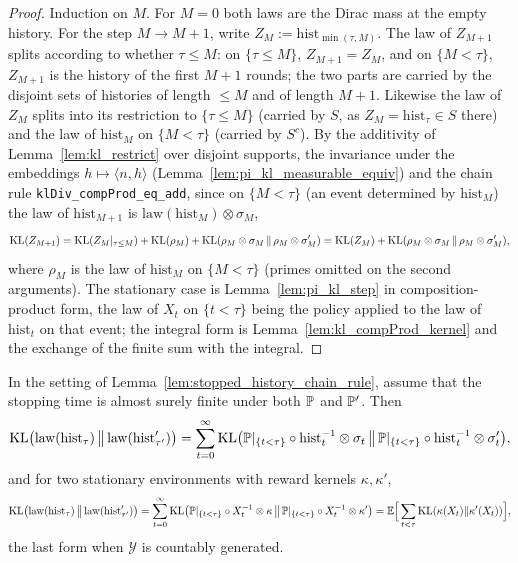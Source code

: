 \begin{proof}
\leanok
{}
Induction on $M$. For $M = 0$ both laws are the Dirac mass at the empty history. For the step
$M\to M+1$, write $Z_M := \mathrm{hist}_{\min(\tau,M)}$. The law of $Z_{M+1}$ splits according
to whether $\tau \le M$: on $\{\tau\le M\}$, $Z_{M+1} = Z_M$, and on $\{M < \tau\}$, $Z_{M+1}$ is the
history of the first $M+1$ rounds; the two parts are carried by the disjoint sets of histories of
length $\le M$ and of length $M+1$. Likewise the law of $Z_M$ splits into its restriction to
$\{\tau\le M\}$ (carried by $S$, as $Z_M = \mathrm{hist}_\tau \in S$ there) and the law of
$\mathrm{hist}_M$ on $\{M<\tau\}$ (carried by $S^c$). By the additivity of
Lemma~\ref{lem:kl_restrict} over disjoint supports, the invariance under the embeddings
$h\mapsto\langle n,h\rangle$ (Lemma~\ref{lem:pi_kl_measurable_equiv}) and the chain rule
\texttt{klDiv\_compProd\_eq\_add}, since on $\{M<\tau\}$ (an event determined by
$\mathrm{hist}_M$) the law of $\mathrm{hist}_{M+1}$ is $\mathrm{law}(\mathrm{hist}_M)\otimes\sigma_M$,
\[
  \mathrm{KL}(Z_{M+1}) = \mathrm{KL}(Z_M|_{\tau\le M}) + \mathrm{KL}(\rho_M) + \mathrm{KL}(\rho_M\otimes\sigma_M\,\|\,\rho_M\otimes\sigma'_M)
  = \mathrm{KL}(Z_M) + \mathrm{KL}(\rho_M\otimes\sigma_M\,\|\,\rho_M\otimes\sigma'_M),
\]
where $\rho_M$ is the law of $\mathrm{hist}_M$ on $\{M<\tau\}$ (primes omitted on the second
arguments). The stationary case is Lemma~\ref{lem:pi_kl_step} in composition-product form, the
law of $X_t$ on $\{t<\tau\}$ being the policy applied to the law of $\mathrm{hist}_t$ on that
event; the integral form is Lemma~\ref{lem:kl_compProd_kernel} and the exchange of the finite sum
with the integral.
\end{proof}

\begin{theorem}\label{thm:divergence_decomposition_stopping}
\leanok
{}
In the setting of Lemma~\ref{lem:stopped_history_chain_rule}, assume that the stopping time is
almost surely finite under both $\mathbb{P}$ and $\mathbb{P}'$. Then
\[
  \mathrm{KL}\big(\mathrm{law}(\mathrm{hist}_\tau)\,\big\|\,\mathrm{law}(\mathrm{hist}'_{\tau'})\big)
  = \sum_{t=0}^{\infty} \mathrm{KL}\big(\mathbb{P}|_{\{t<\tau\}}\circ\mathrm{hist}_t^{-1}\otimes\sigma_t\,\big\|\,
      \mathbb{P}|_{\{t<\tau\}}\circ\mathrm{hist}_t^{-1}\otimes\sigma'_t\big),
\]
and for two stationary environments with reward kernels $\kappa,\kappa'$,
\[
  \mathrm{KL}\big(\mathrm{law}(\mathrm{hist}_\tau)\,\big\|\,\mathrm{law}(\mathrm{hist}'_{\tau'})\big)
  = \sum_{t=0}^{\infty}\mathrm{KL}\big(\mathbb{P}|_{\{t<\tau\}}\circ X_t^{-1}\otimes\kappa\,\big\|\,\mathbb{P}|_{\{t<\tau\}}\circ X_t^{-1}\otimes\kappa'\big)
  = \mathbb{E}\Big[\sum_{t<\tau}\mathrm{KL}(\kappa(X_t)\|\kappa'(X_t))\Big],
\]
the last form when $\mathcal{Y}$ is countably generated.
\end{theorem}


